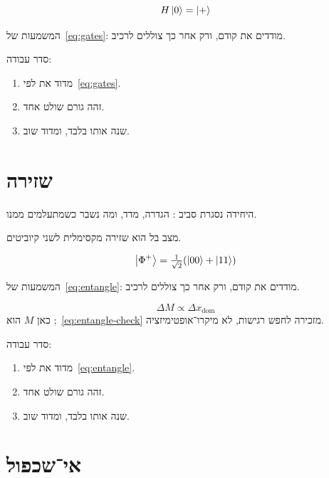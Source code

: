 \begin{equation}
\label{eq:gates}
H\left|0\right\rangle=\left|+\right\rangle
\end{equation}

המשמעות של~\eqref{eq:gates}: מודדים את  קודם, ורק אחר כך צוללים לרכיב.

סדר עבודה:
\begin{enumerate}
\item[(\textbf{א})] מדוד את  לפי~\eqref{eq:gates}.
\item[(\textbf{ב})] זהה גורם שולט אחד.
\item[(\textbf{ג})] שנה אותו בלבד, ומדוד שוב.
\end{enumerate}

\chapter{שזירה}
\label{ch:entangle}

היחידה נסגרת סביב : הגדרה, מדד, ומה נשבר כשמתעלמים ממנו.

\begin{defbox}[frametitle={הגדרה — שזירה}]
מצב בל הוא שזירה מקסימלית לשני קיוביטים.
\end{defbox}

\begin{equation}
\label{eq:entangle}
\left|\Phi^+\right\rangle=\tfrac1{\sqrt2}(\left|00\right\rangle+\left|11\right\rangle)
\end{equation}

המשמעות של~\eqref{eq:entangle}: מודדים את  קודם, ורק אחר כך צוללים לרכיב.

\begin{equation}
\label{eq:entangle-check}
\Delta M \propto \Delta x_{\mathrm{dom}}
\end{equation}
כאן $M$ הוא ;~\eqref{eq:entangle-check} מזכירה לחפש רגישות, לא מיקרו־אופטימיזציה.

סדר עבודה:
\begin{enumerate}
\item[(\textbf{א})] מדוד את  לפי~\eqref{eq:entangle}.
\item[(\textbf{ב})] זהה גורם שולט אחד.
\item[(\textbf{ג})] שנה אותו בלבד, ומדוד שוב.
\end{enumerate}

\chapter{אי־שכפול}
\label{ch:noclone}

